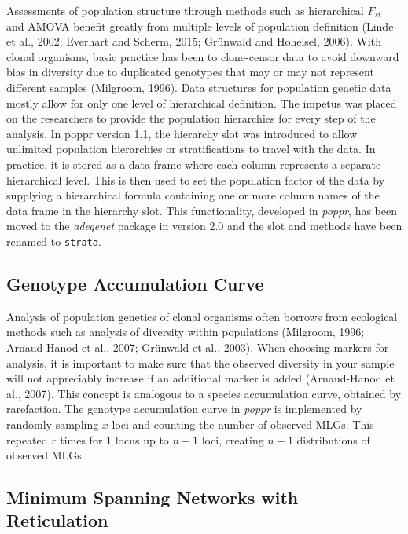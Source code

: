 \documentclass{frontiersSCNS} %
\begin{document}
Assessments of population structure through methods such as hierarchical
\(F_{st}\) and AMOVA benefit greatly from multiple levels of population
definition (Linde et al., 2002; Everhart and Scherm, 2015; Gr{ü}nwald
and Hoheisel, 2006). With clonal organisms, basic practice has been to
clone-censor data to avoid downward bias in diversity due to duplicated
genotypes that may or may not represent different samples (Milgroom,
1996). Data structures for population genetic data mostly allow for only
one level of hierarchical definition. The impetus was placed on the
researchers to provide the population hierarchies for every step of the
analysis. In poppr version 1.1, the hierarchy slot was introduced to
allow unlimited population hierarchies or stratifications to travel with
the data. In practice, it is stored as a data frame where each column
represents a separate hierarchical level. This is then used to set the
population factor of the data by supplying a hierarchical formula
containing one or more column names of the data frame in the hierarchy
slot. This functionality, developed in \emph{poppr}, has been moved to
the \emph{adegenet} package in version 2.0 and the slot and methods have
been renamed to \texttt{strata}.

\subsection*{Genotype Accumulation
Curve}\label{genotype-accumulation-curve}

Analysis of population genetics of clonal organisms often borrows from
ecological methods such as analysis of diversity within populations
(Milgroom, 1996; Arnaud-Hanod et al., 2007; Grünwald et al., 2003). When
choosing markers for analysis, it is important to make sure that the
observed diversity in your sample will not appreciably increase if an
additional marker is added (Arnaud-Hanod et al., 2007). This concept is
analogous to a species accumulation curve, obtained by rarefaction. The
genotype accumulation curve in \emph{poppr} is implemented by randomly
sampling \(x\) loci and counting the number of observed MLGs. This
repeated \(r\) times for 1 locus up to \(n-1\) loci, creating \(n-1\)
distributions of observed MLGs.

\subsection*{Minimum Spanning Networks with
Reticulation}\label{minimum-spanning-networks-with-reticulation}
\end{document}
